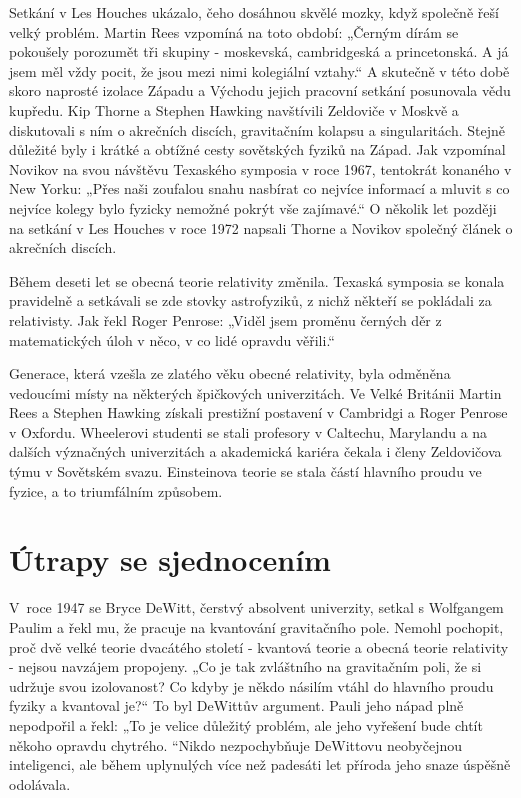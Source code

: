   Setkání v Les Houches ukázalo, čeho dosáhnou skvělé mozky, když společně řeší velký problém.
  Martin Rees vzpomíná na toto období: „Černým dírám se pokoušely porozumět tři skupiny - moskevská,
  cambridgeská a princetonská. A já jsem měl vždy pocit, že jsou mezi nimi kolegiální vztahy.“ A
  skutečně v této době skoro naprosté izolace Západu a Východu jejich pracovní setkání posunovala
  vědu kupředu. Kip Thorne a Stephen Hawking navštívili Zeldoviče v Moskvě a diskutovali s ním o
  akrečních discích, gravitačním kolapsu a singularitách. Stejně důležité byly i krátké a obtížné
  cesty sovětských fyziků na Západ. Jak vzpomínal Novikov na svou návštěvu Texaského symposia v roce
  1967, tentokrát konaného v New Yorku: „Přes naši zoufalou snahu nasbírat co nejvíce informací a
  mluvit s co nejvíce kolegy bylo fyzicky nemožné pokrýt vše zajímavé.“ O několik let později na
  setkání v Les Houches v roce 1972 napsali Thorne a Novikov společný článek o akrečních discích. 

  Během deseti let se obecná teorie relativity změnila. Texaská symposia se konala pravidelně a
  setkávali se zde stovky astrofyziků, z nichž někteří se pokládali za relativisty. Jak řekl Roger
  Penrose: „Viděl jsem proměnu černých děr z matematických úloh v něco, v co lidé opravdu věřili.“

  Generace, která vzešla ze zlatého věku obecné relativity, byla odměněna vedoucími místy na
  některých špičkových univerzitách. Ve Velké Británii Martin Rees a Stephen Hawking získali
  prestižní postavení v Cambridgi a Roger Penrose v Oxfordu. Wheelerovi studenti se stali profesory
  v Caltechu, Marylandu a na dalších význačných univerzitách a akademická kariéra čekala i členy
  Zeldovičova týmu v Sovětském svazu. Einsteinova teorie se stala částí hlavního proudu ve fyzice, a
  to triumfálním způsobem. 

\section{Útrapy se sjednocením}\label{kulIchIIIsecX}
  V roce 1947 se Bryce DeWitt, čerstvý absolvent univerzity, setkal s Wolfgangem Paulim a řekl mu,
  že pracuje na kvantování gravitačního pole. Nemohl pochopit, proč dvě velké teorie dvacátého
  století - kvantová teorie a obecná teorie relativity - nejsou navzájem propojeny. „Co je tak
  zvláštního na gravitačním poli, že si udržuje svou izolovanost? Co kdyby je někdo násilím vtáhl do
  hlavního proudu fyziky a kvantoval je?“ To byl DeWittův argument. Pauli jeho nápad plně nepodpořil
  a řekl: „To je velice důležitý problém, ale jeho vyřešení bude chtít někoho opravdu chytrého.
  “Nikdo nezpochybňuje DeWittovu neobyčejnou inteligenci, ale během uplynulých více než padesáti let
  příroda jeho snaze úspěšně odolávala. 
  
